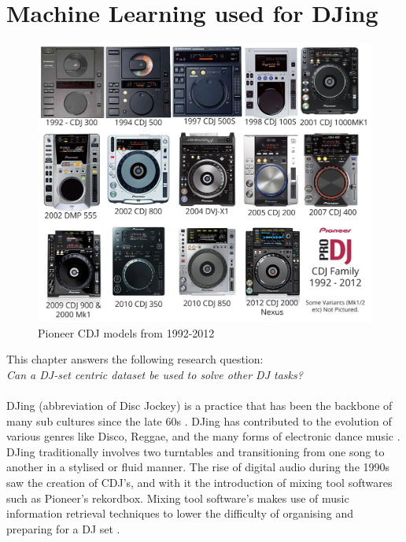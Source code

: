 
\graphicspath{{Chapter3/}}

\chapter{Machine Learning used for DJing}

\begin{figure}[H]
	\includegraphics[scale=0.3]{images/pioneers_history}
	\centering
	\caption{Pioneer CDJ models from 1992-2012 \citep{chesters_history_2017}} 
\end{figure}

This chapter answers the following research question:
\\

\textit{Can a DJ-set centric dataset be used to solve other DJ tasks?} 
\\
\\
DJing (abbreviation of Disc Jockey) is a practice that has been the backbone of many sub cultures since the late 60s \citep{brewster_last_2014}. DJing has contributed to the evolution of various genres like Disco, Reggae, and the many forms of electronic dance music \citep{partridge_dub_2010} \citep{reynolds_energy_2013}. DJing traditionally involves two turntables and transitioning from one song to another in a stylised or fluid manner. The rise of digital audio during the 1990s saw the creation of CDJ's, and with it the introduction of mixing tool softwares such as Pioneer's rekordbox. Mixing tool software's makes use of music information retrieval techniques to lower the difficulty of organising and preparing for a DJ set \citep{kim_automatic_2017}. 

